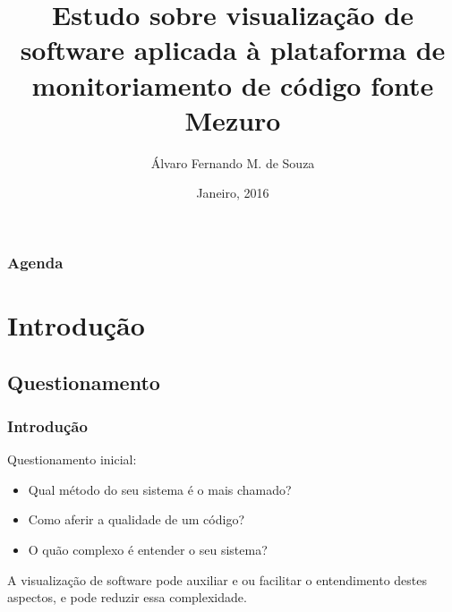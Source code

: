 \documentclass{beamer}
\title[Visualização de Software - Mezuro]{Estudo sobre visualizaç\~ao de software aplicada à plataforma de
monitoriamento de código fonte Mezuro} %
\author{Álvaro Fernando M. de Souza} %
\institute[UnB-FGA] %
{
Universidade de Brasília - Faculdade Gama \\ %
\medskip
\textit{alvarofernandoms@gmail.com} %
}
\date{Janeiro, 2016} %
\begin{document}
\begin{frame}
\titlepage %
\end{frame}

\begin{frame}
\frametitle{Agenda} %
\tableofcontents %
\end{frame}


\section{Introdução} %

\subsection{Questionamento}

\begin{frame}
\frametitle{Introdução}
Questionamento inicial: \\
\begin{itemize}
\item Qual método do seu sistema é o mais chamado?
\item Como aferir a qualidade de um código?
\item O quão complexo é entender o seu sistema?	
\end{itemize}
A visualização de software pode auxiliar e ou facilitar o entendimento destes aspectos, e pode reduzir essa complexidade.
\end{frame}
\end{document}
